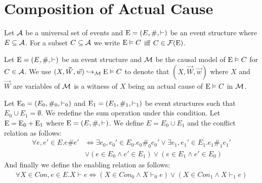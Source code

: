 \section{Composition of Actual Cause}

\begin{notion}
    Let $\mathcal{A}$ be a universal set of events and $\mathrm{E} = (E,\#,\vdash)$
    be an event structure where $E \subseteq \mathcal{A}$.
    For a subset $C \subseteq \mathcal{A}$ we write $\mathrm{E} \vDash C$ iff
    $C \in \mathcal{F}(\mathrm{E})$.
\end{notion}

\begin{notion}
    Let $\mathrm{E} = (E,\#,\vdash)$ be an event structure and
    $\mathcal{M}$ be the causal model of $\mathrm{E} \vDash C$  for $C \in \mathcal{A}$.
    We use $(X,\vec W, \vec w) \hookrightarrow_{\mathcal{M}} \mathrm{E} \vDash C$ to denote
    that $(X,\vec W,\vec w)$ where $X$ and $\vec W$ are variables of
    $\mathcal{M}$ is a witness of $X$ being an actual cause of
    $\mathrm{E} \vDash C$ in $\mathcal{M}$.
\end{notion}

\begin{definition}
    Let $\mathrm{E}_0 = (E_0,\#_0,\vdash_0)$ and
    $\mathrm{E}_1 = (E_1,\#_1,\vdash_1)$ be event structures
    such that $E_0 \cup E_1 = \emptyset$.
    We redefine the sum operation under this condition.
    Let $ \mathrm{E} = \mathrm{E}_0 + \mathrm{E}_1$ where
    $\mathrm{E} = (E,\#,\vdash)$.
    We define $E = E_0 \cup E_1$ and the conflict relation as follows:
    \begin{align*}
        \forall e,e' \in E. e \# e' & \iff
        \exists e_0,e_0' \in E_0. e_0 \#_0 e_0'
        \vee \exists e_1,e_1' \in E_1. e_1 \#_1 e_1'                                 \\
                                    & \vee \left(e \in E_0 \wedge e' \in E_1 \right)
        \vee \left(e \in E_1 \wedge e' \in E_0 \right)
    \end{align*}
    And finally we define the enabling relation as follows:
    \begin{align*}
        \forall X \in Con, e \in E. X \vdash e \iff
        \left( X \in Con_0 \wedge X \vdash_0 e \right)
        \vee \left( X \in Con_1 \wedge X \vdash_1 e \right)
    \end{align*}
\end{definition}

